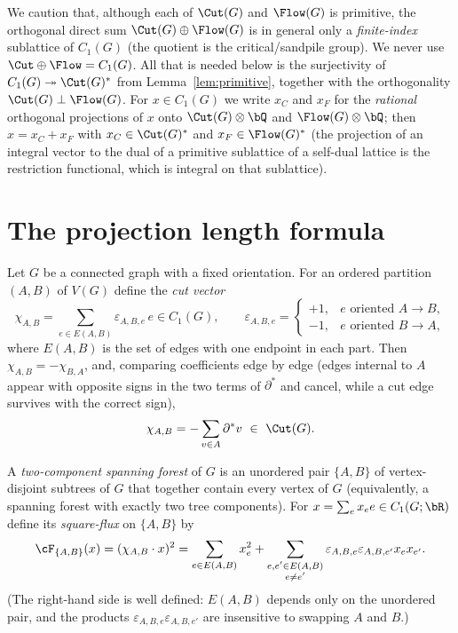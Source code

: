\begin{rem}
\label{rem:proj}
We caution that, although each of $\Cut(G)$ and $\Flow(G)$ is primitive, the orthogonal
direct sum $\Cut(G)\oplus\Flow(G)$ is in general only a \emph{finite-index} sublattice of
$C_1(G)$ (the quotient is the critical/sandpile group).  We never use
$\Cut\oplus\Flow=C_1(G)$.  All that is needed below is the surjectivity of
$C_1(G)\twoheadrightarrow\Cut(G)^\ast$ from Lemma~\ref{lem:primitive}, together with the
orthogonality $\Cut(G)\perp\Flow(G)$.  For $x\in C_1(G)$ we write $x_C$ and $x_F$ for the
\emph{rational} orthogonal projections of $x$ onto $\Cut(G)\otimes\bQ$ and
$\Flow(G)\otimes\bQ$; then $x=x_C+x_F$ with $x_C\in\Cut(G)^\ast$ and $x_F\in\Flow(G)^\ast$
(the projection of an integral vector to the dual of a primitive sublattice of a self-dual
lattice is the restriction functional, which is integral on that sublattice).
\end{rem}

\section{The projection length formula}
\label{sec:length}

Let $G$ be a connected graph with a fixed orientation.  For an ordered partition $(A,B)$ of
$V(G)$ define the \emph{cut vector}
\[
\chi_{A,B}=\sum_{e\in E(A,B)}\varepsilon_{A,B,e}\,e\in C_1(G),
\qquad
\varepsilon_{A,B,e}=\begin{cases}+1,&e\text{ oriented }A\to B,\\-1,&e\text{ oriented }B\to A,\end{cases}
\]
where $E(A,B)$ is the set of edges with one endpoint in each part.  Then
$\chi_{A,B}=-\chi_{B,A}$, and, comparing coefficients edge by edge (edges internal to $A$
appear with opposite signs in the two terms of $\partial^\ast$ and cancel, while a cut edge
survives with the correct sign),
\begin{equation}
\label{eq:chi}
\chi_{A,B}=-\sum_{v\in A}\partial^\ast v\ \in\ \Cut(G).
\end{equation}

A \emph{two-component spanning forest} of $G$ is an unordered pair $\{A,B\}$ of vertex-disjoint
subtrees of $G$ that together contain every vertex of $G$ (equivalently, a spanning forest
with exactly two tree components).  For $x=\sum_e x_e e\in C_1(G;\bR)$ define its
\emph{square-flux} on $\{A,B\}$ by
\begin{equation}
\label{eq:flux}
\cF_{\{A,B\}}(x)=(\chi_{A,B}\cdot x)^2
=\sum_{e\in E(A,B)}x_e^2+\sum_{\substack{e,e'\in E(A,B)\\ e\ne e'}}\varepsilon_{A,B,e}\varepsilon_{A,B,e'}x_ex_{e'} .
\end{equation}
(The right-hand side is well defined: $E(A,B)$ depends only on the unordered pair, and the
products $\varepsilon_{A,B,e}\varepsilon_{A,B,e'}$ are insensitive to swapping $A$ and $B$.)

